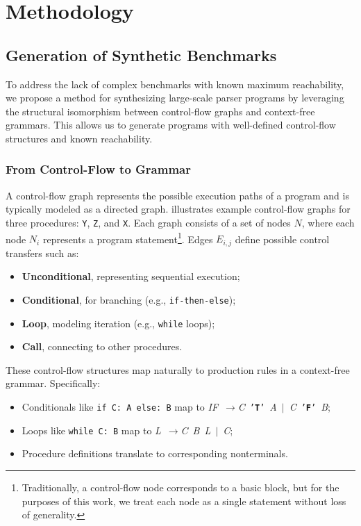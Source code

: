 \documentclass[conference,anonymous,review]{IEEEtran}
\def\<#1>{\texttt{#1}}
\def\term#1{\texttt{'\textbf{#1}'}}
\def\nonterm#1{\textlangle\textnormal{\emph{#1}}\textrangle}
\def\expandsto{\(\rightarrow{}\)}
\begin{document}
\section{Methodology}
\label{sec:methodology}
\subsection{Generation of Synthetic Benchmarks}
\label{sec:synthetic-benchmarks}

To address the lack of complex benchmarks with known maximum reachability,
we propose a method for synthesizing large-scale parser programs
by leveraging the structural isomorphism between control-flow graphs and
context-free grammars.
This allows us to generate programs with well-defined control-flow structures
and known reachability.

\subsubsection{From Control-Flow to Grammar}

A control-flow graph represents the possible execution paths of a program and
is typically modeled as a directed graph.
 illustrates example control-flow graphs for three procedures:
\<Y>, \<Z>, and \<X>.
Each graph consists of a set of nodes $N$, where each node $N_i$ represents
a program statement\footnote{
Traditionally, a control-flow node corresponds to a basic block, but for
the purposes of this work, we treat each node as a single statement without
loss of generality.}.
Edges $E_{i,j}$ define possible control transfers such as:

\begin{itemize}
    \item \textbf{Unconditional}, representing sequential execution;
    \item \textbf{Conditional}, for branching (e.g., \<if-then-else>);
    \item \textbf{Loop}, modeling iteration (e.g., \<while> loops);
    \item \textbf{Call}, connecting to other procedures.
\end{itemize}

These control-flow structures map naturally to production rules in a context-free grammar. Specifically:
\begin{itemize}
    \item Conditionals like \<if C: A else: B> map to  
      \mbox{\nonterm{IF} \expandsto \nonterm{C} \term{T} \nonterm{A}  $|$ \nonterm{C} \term{F} \nonterm{B}};
    \item Loops like \<while C: B> map to  
      \mbox{\nonterm{L} \expandsto \nonterm{C} \nonterm{B} \nonterm{L} $|$ \nonterm{C}};
    \item Procedure definitions translate to corresponding nonterminals.
\end{itemize}
\end{document}
